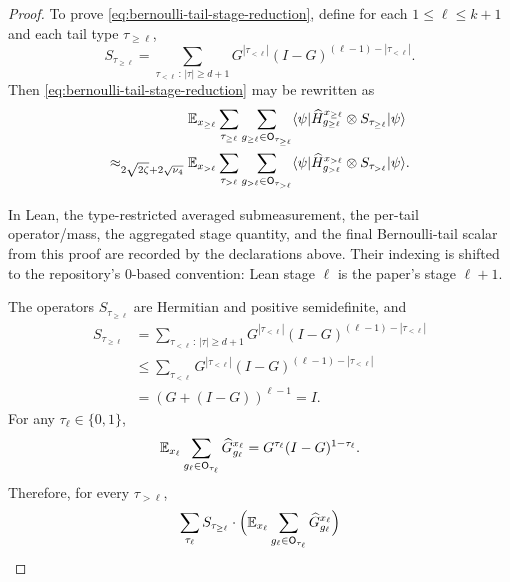 \begin{proof}
	To prove \ref{eq:bernoulli-tail-stage-reduction}, define for each $1\le \ell \le k+1$ and each tail type $\tau_{\ge \ell}$,
	\begin{equation}\label{eq:S-def}
		S_{\tau_{\ge \ell}}
		=
		\sum_{\tau_{<\ell}\,:\,|\tau|\ge d+1}
		G^{|\tau_{<\ell}|}(I-G)^{(\ell-1)-|\tau_{<\ell}|}.
	\end{equation}
	Then \ref{eq:bernoulli-tail-stage-reduction} may be rewritten as
	\begin{align}
		                                         & \mathbb{E}_{x_{\ge \ell}} \sum_{\tau_{\ge \ell}} \sum_{g_{\ge \ell}\in \mathsf O_{\tau_{\ge \ell}}}
		\langle \psi \rvert \widehat H_{g_{\ge \ell}}^{x_{\ge \ell}} \otimes S_{\tau_{\ge \ell}} \lvert \psi \rangle\nonumber                                        \\
		\approx_{2\sqrt{2\zeta}+2\sqrt{\nu_4}}{} &
		\mathbb{E}_{x_{>\ell}} \sum_{\tau_{>\ell}} \sum_{g_{>\ell}\in \mathsf O_{\tau_{>\ell}}}
		\langle \psi \rvert \widehat H_{g_{>\ell}}^{x_{>\ell}} \otimes S_{\tau_{>\ell}} \lvert \psi \rangle.
		\label{eq:bernoulli-tail-stage-reduction-expanded}
	\end{align}
	\begin{remark}
		In Lean, the type-restricted averaged submeasurement, the per-tail operator/mass, the aggregated stage quantity, and the final Bernoulli-tail scalar from this proof are recorded by the declarations above. Their indexing is shifted to the repository's 0-based convention: Lean stage $\ell$ is the paper's stage $\ell+1$.
	\end{remark}
	The operators $S_{\tau_{\ge \ell}}$ are Hermitian and positive semidefinite, and
	\begin{align}
		S_{\tau_{\ge \ell}}
		 & =
		\sum_{\tau_{<\ell}\,:\,|\tau|\ge d+1}
		G^{|\tau_{<\ell}|}(I-G)^{(\ell-1)-|\tau_{<\ell}|}\nonumber \\
		 & \le
		\sum_{\tau_{<\ell}}
		G^{|\tau_{<\ell}|}(I-G)^{(\ell-1)-|\tau_{<\ell}|}\nonumber \\
		 & =
		(G+(I-G))^{\ell-1}
		= I.
		\label{eq:S-bound}
	\end{align}
	For any $\tau_\ell \in \{0,1\}$,
	\begin{equation}\label{eq:explicit-formula-for-G-expectation}
		\mathbb{E}_{x_\ell} \sum_{g_\ell \in \mathsf O_{\tau_\ell}} \widehat G_{g_\ell}^{x_\ell}
		=
		G^{\tau_\ell}(I-G)^{1-\tau_\ell}.
	\end{equation}
	Therefore, for every $\tau_{>\ell}$,
	\begin{align}
		\sum_{\tau_\ell}
		S_{\tau_{\ge \ell}}
		\cdot
		\Bigl(\E_{x_\ell} \sum_{g_\ell \in \mathsf O_{\tau_\ell}} \widehat G_{g_\ell}^{x_\ell}\Bigr)

\end{align}
\end{proof}
